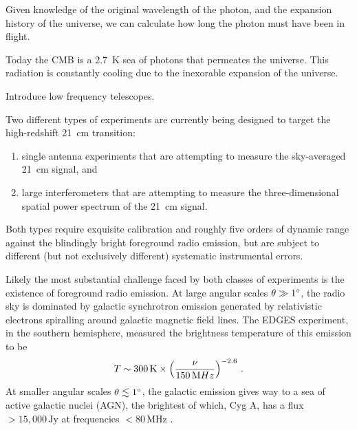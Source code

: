 \begin{bibunit}
Given knowledge of the
original wavelength of the photon, and the expansion history of the universe, we can calculate how
long the photon must have been in flight.


Today the CMB is a 2.7~K sea of photons that permeates the universe. This radiation is constantly
cooling due to the inexorable expansion of the universe.


Introduce low frequency telescopes.

Two different types of experiments are currently being designed to target the high-redshift 21~cm
transition:
\begin{enumerate}
    \item single antenna experiments that are attempting to measure the sky-averaged 21~cm signal,
        and
    \item large interferometers that are attempting to measure the three-dimensional spatial power
        spectrum of the 21~cm signal.
\end{enumerate}
Both types require exquisite calibration and roughly five orders of dynamic range against the
blindingly bright foreground radio emission, but are subject to different (but not exclusively
different) systematic instrumental errors.

Likely the most substantial challenge faced by both classes of experiments is the existence of
foreground radio emission. At large angular scales $\theta \gg 1\arcdeg$, the radio sky is dominated
by galactic synchrotron emission generated by relativistic electrons spiralling around galactic
magnetic field lines. The EDGES experiment, in the southern hemisphere, measured the brightness
temperature of this emission to be \citep{2017MNRAS.464.4995M}
\begin{equation}
    T \sim 300\,{\rm K} \times \left(\frac{\nu}{150\,{\rm MHz}}\right)^{-2.6}\,.
\end{equation}
At smaller angular scales $\theta \lesssim 1\arcdeg$, the galactic emission
gives way to a sea of active galactic nuclei (AGN), the brightest of which, Cyg A, has a flux
$>15,000\,\text{Jy}$ at frequencies $<80\,\text{MHz}$ \citep{1977A&A....61...99B}.


\end{bibunit}

